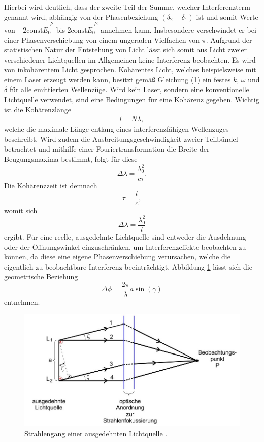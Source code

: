 \noindent Hierbei wird deutlich, dass der zweite Teil der Summe, welcher Interferenzterm genannt wird, abhängig von der
Phasenbeziehung $(\delta_\text{2} - \delta_\text{1})$ ist und somit Werte von $-2 \mathrm{const} \vec{E_\text{0}}^{2}$ bis 
$2 \mathrm{const} \vec{E_\text{0}}^{2}$ annehmen kann. Insbesondere verschwindet er bei einer Phasenverschiebung von einem
ungeraden Vielfachen von $\pi$. Aufgrund der statistischen Natur der Entstehung von Licht lässt sich somit aus Licht
zweier verschiedener Lichtquellen im Allgemeinen keine Interferenz beobachten. Es wird von inkohärentem Licht gesprochen.
Kohärentes Licht, welches beispielsweise mit einem Laser erzeugt werden kann, besitzt gemäß Gleichung (1) ein festes $k$, 
$\omega$ und $\delta$ für alle emittierten Wellenzüge. Wird kein Laser, sondern eine konventionelle Lichtquelle verwendet,
sind eine Bedingungen für eine Kohärenz gegeben. Wichtig ist die Kohärenzlänge 
\begin{align}
l = N \lambda,
\end{align}
welche die maximale Länge entlang eines interferenzfähigen Wellenzuges beschreibt. Wird zudem die Ausbreitungsgeschwindigkeit 
zweier Teilbündel betrachtet und mithilfe einer Fouriertransformation die Breite der Beugungsmaxima bestimmt,
folgt für diese
\begin{equation*}
  \Delta \lambda = \frac{\lambda_\text{0}^{2}}{c \tau}.
\end{equation*}
Die Kohärenzzeit ist demnach
\begin{equation*}
  \tau = \frac{l}{c},
\end{equation*}
womit sich
\begin{equation}
  \Delta \lambda = \frac{\lambda_\text{0}^{2}}{l}
\end{equation}
ergibt.
Für eine reelle, ausgedehnte Lichtquelle sind entweder die Ausdehnung oder der Öffnungswinkel einzuschränken, um Interferenzeffekte beobachten zu können,
da diese eine eigene Phasenverschiebung verursachen, welche die eigentlich zu beobachtbare Interferenz beeinträchtigt.
Abbildung \ref{fig:ausgedehnt} lässt sich die geometrische Beziehung
\begin{equation}
\Delta \phi = \frac{2\pi}{\lambda}a \sin(\gamma)
\end{equation}
entnehmen.
\begin{figure}
  \centering
  \includegraphics[scale=0.8]{ausgedehnt.jpg}
  \caption{Strahlengang einer ausgedehnten Lichtquelle \cite{Anleitung}.}
  \label{fig:ausgedehnt}
\end{figure}
